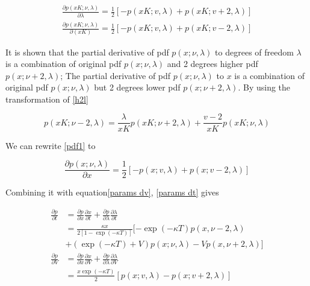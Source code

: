 \begin{equation}\label{pdf1}
    \begin{gathered}
        \frac{\partial p(xK;\nu,\lambda)}{\partial \lambda}=\frac{1}{2}[-p(xK ; v, \lambda)+p(xK ; v+2, \lambda)] \\
        \frac{\partial p(xK;\nu,\lambda)}{\partial (xK)}=\frac{1}{2}[-p(xK ; v, \lambda)+p(xK ; v-2, \lambda)]
    \end{gathered}
\end{equation}

\noindent It is shown that the partial derivative of pdf $p(x; \nu, \lambda)$ to degrees of freedom $\lambda$ is a combination of original pdf $p(x; \nu, \lambda)$ and 2 degrees higher pdf $p(x; \nu+2, \lambda)$; The partial derivative of pdf $p(x; \nu, \lambda)$ to $x$ is a combination of original pdf $p(x; \nu, \lambda)$ but 2 degrees lower pdf $p(x; \nu+2, \lambda)$. By using the transformation of \eqref{h2l}

\begin{equation}\label{l2h}
    p(xK ; \nu-2, \lambda)=\frac{\lambda}{xK} p(xK ; \nu+2, \lambda)+\frac{v-2}{xK} p(xK ; \nu, \lambda)
\end{equation}

\noindent We can rewrite \eqref{pdf1} to

\begin{equation}\label{pdf2}
    \frac{\partial p(x;\nu,\lambda)}{\partial x}=\frac{1}{2}[-p(x ; v, \lambda)+p(x ; v-2, \lambda)]
\end{equation}



Combining it with equation\eqref{params dv}, \eqref{params dt} gives

\begin{equation}
    \begin{aligned}
        \frac{\partial p}{\partial t}&= \frac{\partial p}{\partial x}\frac{\partial x}{\partial t} + \frac{\partial p}{\partial \lambda} \frac{\partial \lambda}{\partial t} \\
        &= \frac{\kappa x }{2[1 - \exp(- \kappa T)]} [ - \exp(- \kappa T) p(x, \nu-2, \lambda)\\
        &+ (\exp(- \kappa T)+V) p(x ; \nu, \lambda) - Vp(x, \nu+2, \lambda)]\\
        \frac{\partial p}{\partial V} &= \frac{\partial p}{\partial x}\frac{\partial x}{\partial V} + \frac{\partial p}{\partial \lambda} \frac{\partial \lambda}{\partial V} \\
        &= \frac{x \exp(-\kappa T)}{2}[p(x ; v, \lambda)-p(x ; v+2, \lambda)]
    \end{aligned}
\end{equation}

